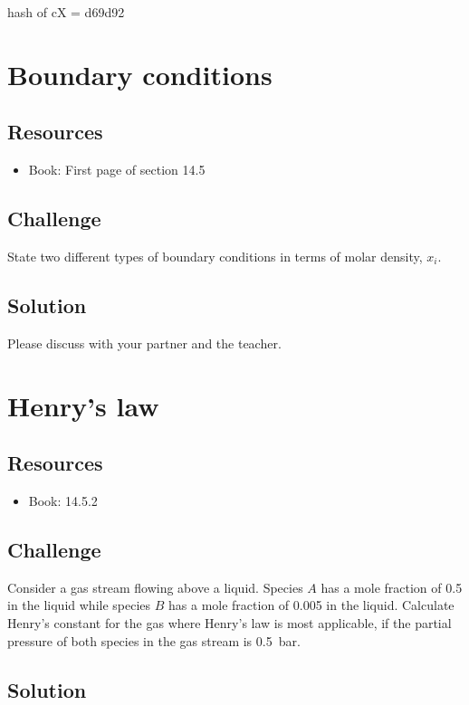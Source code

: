 hash of cX = d69d92




\newpage
\section{Boundary conditions}

\subsection*{Resources}
\begin{itemize}
    \item Book: First page of section 14.5
\end{itemize}

\subsection*{Challenge}
State two different types of boundary conditions in terms of molar density, $x_i$.

\subsection*{Solution}
Please discuss with your partner and the teacher.




\newpage
\section{Henry's law}

\subsection*{Resources}
\begin{itemize}
    \item Book: 14.5.2
\end{itemize}

\subsection*{Challenge}
Consider a gas stream flowing above a liquid. Species $A$ has a mole fraction of \num{0.5} in the liquid while species $B$ has a mole fraction of \num{0.005} in the liquid. Calculate Henry's constant for the gas where Henry's law is most applicable, if the partial pressure of both species in the gas stream is \SI{0.5}{\bar}.

\subsection*{Solution}




